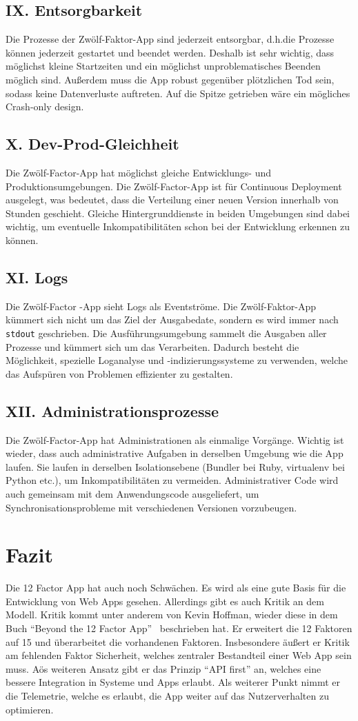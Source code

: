\documentclass[fleqn,10pt]{SelfArx} %
\begin{document}
\subsection{IX. Entsorgbarkeit}
Die Prozesse der Zwölf-Faktor-App sind jederzeit entsorgbar, d.h.\@ die Prozesse können jederzeit gestartet und beendet werden. Deshalb ist sehr wichtig, dass möglichst kleine Startzeiten und ein möglichst unproblematisches Beenden möglich sind. Außerdem muss die App robust gegenüber plötzlichen Tod sein, sodass keine Datenverluste auftreten. Auf die Spitze getrieben wäre ein mögliches Crash-only design.
\subsection{X. Dev-Prod-Gleichheit}
Die Zwölf-Factor-App hat möglichst gleiche Entwicklungs- und Produktionsumgebungen. Die Zwölf-Factor-App ist für Continuous Deployment ausgelegt, was bedeutet, dass die Verteilung einer neuen Version innerhalb von Stunden geschieht. Gleiche Hintergrunddienste in beiden Umgebungen sind dabei wichtig, um eventuelle Inkompatibilitäten schon bei der Entwicklung erkennen zu können.
\subsection{XI. Logs}
Die Zwölf-Factor -App sieht Logs als Eventströme. Die Zwölf-Faktor-App kümmert sich nicht um das Ziel der Ausgabedate, sondern es wird immer nach \texttt{stdout} geschrieben. Die Ausführungsumgebung sammelt die Ausgaben aller Prozesse und kümmert sich um das Verarbeiten. Dadurch besteht die Möglichkeit, spezielle Loganalyse und -indizierungssysteme zu verwenden, welche das Aufspüren von Problemen effizienter zu gestalten.
\subsection{XII. Administrationsprozesse}
Die Zwölf-Factor-App hat Administrationen als einmalige Vorgänge. Wichtig ist wieder, dass auch administrative Aufgaben in derselben Umgebung wie die App laufen. Sie laufen in derselben Isolationsebene (Bundler bei Ruby, virtualenv bei Python etc.), um Inkompatibilitäten zu vermeiden. Administrativer Code wird auch gemeinsam mit dem Anwendungscode ausgeliefert, um Synchronisationsprobleme mit verschiedenen Versionen vorzubeugen.
\section{Fazit}
Die 12 Factor App hat auch noch Schwächen. Es wird als eine gute Basis für die Entwicklung von Web Apps gesehen. Allerdings gibt es auch Kritik an dem Modell. Kritik kommt unter anderem von Kevin Hoffman, wieder diese in dem Buch \enquote{Beyond the 12 Factor App}~\cite{beyond} beschrieben hat. Er erweitert die 12 Faktoren auf 15 und überarbeitet die vorhandenen Faktoren. Insbesondere äußert er Kritik am fehlenden Faktor Sicherheit, welches zentraler Bestandteil einer Web App sein muss. Aös weiteren Ansatz gibt er das Prinzip \enquote{API first} an, welches eine bessere Integration in Systeme und Apps erlaubt. Als weiterer Punkt nimmt er die Telemetrie, welche es erlaubt, die App weiter auf das Nutzerverhalten zu optimieren.
\end{document}
